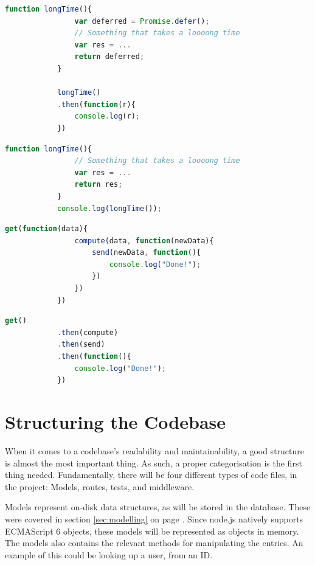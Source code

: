 		\begin{lstlisting}[language=Javascript,gobble=12,caption={Using promises, in Node.js},label={lst:node:promise}]
            function longTime(){
                var deferred = Promise.defer();
                // Something that takes a loooong time
                var res = ...
                return deferred;
            }
            
            longTime()
            .then(function(r){
                console.log(r);
            })
		\end{lstlisting}

		\begin{lstlisting}[language=Javascript,gobble=12,caption={The wrong way to do it, in Node.js},label={lst:node:wrong}]
            function longTime(){
                // Something that takes a loooong time
                var res = ...
                return res;
            }
            console.log(longTime());
		\end{lstlisting}
		

		\begin{lstlisting}[language=Javascript,gobble=12,caption={Chaining data between callbacks in node.js},label={lst:node:callbackhell}]
            get(function(data){
                compute(data, function(newData){
                    send(newData, function(){
                        console.log("Done!");
                    })
                })
            })
		\end{lstlisting}
		
		\begin{lstlisting}[language=Javascript,gobble=12,caption={Chaining data between promises in node.js},label={lst:node:promisegoodness}]
            get()
            .then(compute)
            .then(send)
            .then(function(){
                console.log("Done!");
            })
		\end{lstlisting}

	\section{Structuring the Codebase}
		\label{sec:impl:backend:codebase}
		When it comes to a codebase's readability and maintainability, a good structure is almost the most important thing. As such, a proper categorisation is the first thing needed. Fundamentally, there will be four different types of code files, in the project: Models, routes, tests, and middleware.

		Models represent on-disk data structures, as will be stored in the database. These were covered in section \ref{sec:modelling} on page \pageref{sec:modelling}. Since node.js natively supports ECMAScript 6 objects, these models will be represented as objects in memory. The models also contains the relevant methods for manipulating the entries. An example of this could be looking up a user, from an ID.

